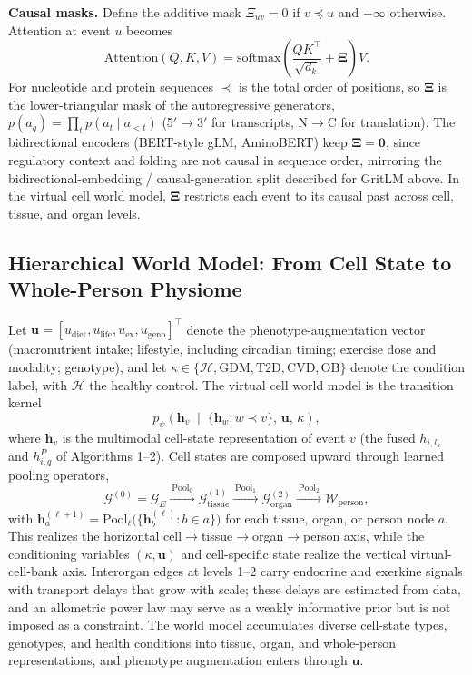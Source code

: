 \documentclass[11pt]{article}
\begin{document}
\textbf{Causal masks.} Define the additive mask $\Xi_{uv}=0$ if $v\preceq u$ and $-\infty$ otherwise. Attention at event $u$ becomes
\begin{equation}
\text{Attention}(Q,K,V)=\text{softmax}\!\left(\frac{QK^{\top}}{\sqrt{d_k}}+\boldsymbol{\Xi}\right)V.
\end{equation}
For nucleotide and protein sequences $\prec$ is the total order of positions, so $\boldsymbol{\Xi}$ is the lower-triangular mask of the autoregressive generators, $p(a_q)=\prod_t p(a_t\mid a_{<t})$ (5$'\rightarrow$3$'$ for transcripts, N$\rightarrow$C for translation). The bidirectional encoders (BERT-style gLM, AminoBERT) keep $\boldsymbol{\Xi}=\mathbf{0}$, since regulatory context and folding are not causal in sequence order, mirroring the bidirectional-embedding / causal-generation split described for GritLM above. In the virtual cell world model, $\boldsymbol{\Xi}$ restricts each event to its causal past across cell, tissue, and organ levels.

\subsection{Hierarchical World Model: From Cell State to Whole-Person Physiome}
Let $\mathbf{u}=[u_{\text{diet}},u_{\text{life}},u_{\text{ex}},u_{\text{geno}}]^{\top}$ denote the phenotype-augmentation vector (macronutrient intake; lifestyle, including circadian timing; exercise dose and modality; genotype), and let $\kappa\in\{\mathcal{H},\text{GDM},\text{T2D},\text{CVD},\text{OB}\}$ denote the condition label, with $\mathcal{H}$ the healthy control. The virtual cell world model is the transition kernel
\begin{equation}
p_\psi\!\left(\mathbf{h}_v \;\middle|\; \{\mathbf{h}_w : w\prec v\},\,\mathbf{u},\,\kappa\right),
\end{equation}
where $\mathbf{h}_v$ is the multimodal cell-state representation of event $v$ (the fused $h_{i,l_k}$ and $h^{P}_{i,q}$ of Algorithms 1--2). Cell states are composed upward through learned pooling operators,
\begin{equation}
\mathcal{G}^{(0)}=\mathcal{G}_E \xrightarrow{\ \text{Pool}_0\ } \mathcal{G}^{(1)}_{\text{tissue}} \xrightarrow{\ \text{Pool}_1\ } \mathcal{G}^{(2)}_{\text{organ}} \xrightarrow{\ \text{Pool}_2\ } \mathcal{W}_{\text{person}},
\end{equation}
with $\mathbf{h}^{(\ell+1)}_a=\text{Pool}_\ell\big(\{\mathbf{h}^{(\ell)}_b : b\in a\}\big)$ for each tissue, organ, or person node $a$. This realizes the horizontal cell$\rightarrow$tissue$\rightarrow$organ$\rightarrow$person axis, while the conditioning variables $(\kappa,\mathbf{u})$ and cell-specific state realize the vertical virtual-cell-bank axis. Interorgan edges at levels 1--2 carry endocrine and exerkine signals with transport delays that grow with scale; these delays are estimated from data, and an allometric power law may serve as a weakly informative prior but is not imposed as a constraint. The world model accumulates diverse cell-state types, genotypes, and health conditions into tissue, organ, and whole-person representations, and phenotype augmentation enters through $\mathbf{u}$.
\end{document}
